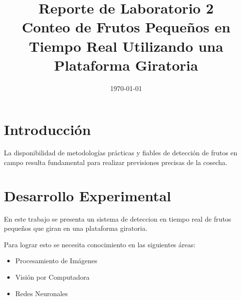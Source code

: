 \documentclass[conference]{IEEEtran}
\date{\specialdate\today}
\begin{document}
\newcommand{\breite}{0.9} %
\newcommand{\RelacionFiguradoscolumnas}{0.9}
\newcommand{\RelacionFiguradoscolumnasPuntoCinco}{0.45}

\title{Reporte de Laboratorio 2 \\ Conteo de Frutos Pequeños en Tiempo Real Utilizando una Plataforma Giratoria}

\author{
}

\maketitle

\begin{abstract} 
    
\end{abstract}

\section{Introducción}
La disponibilidad de metodologías prácticas y fiables de detección de frutos en campo resulta fundamental para realizar previsiones precisas de la cosecha\cite{}. 


\section{Desarrollo Experimental}
En este trabajo se presenta un sistema de deteccion en tiempo real de frutos pequeños que giran en una plataforma giratoria.

Para lograr esto se necesita conocimiento en las siguientes áreas:
\begin{itemize}
    \item Procesamiento de Imágenes
    \item Visión por Computadora
    \item Redes Neuronales
\end{itemize}
\end{document}
